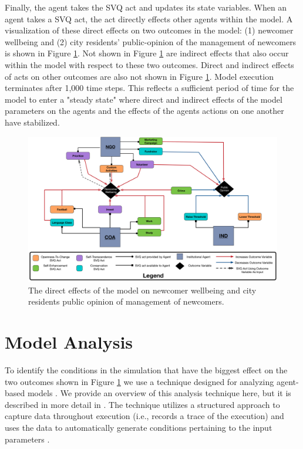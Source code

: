 \documentclass{scspaperproc}
\theoremstyle{scsthe}
\begin{document}
Finally, the agent takes the SVQ act and updates its state variables. When an agent takes a SVQ act, the act directly effects other agents within the model. A visualization of these direct effects on two outcomes in the model: (1) newcomer wellbeing and (2) city residents' public-opinion of the management of newcomers is shown in Figure \ref{fig:model-dynamics}. Not shown in Figure \ref{fig:model-dynamics} are indirect effects that also occur within the model with respect to these two outcomes. Direct and indirect effects of acts on other outcomes are also not shown in Figure \ref{fig:model-dynamics}. Model execution terminates after 1,000 time steps. This reflects a sufficient period of time for the model to enter a "steady state" where direct and indirect effects of the model parameters on the agents and the effects of the agents actions on one another have stabilized.

\begin{figure}[htb]
{
\centering
\includegraphics[width=0.95\columnwidth]{Newcomer-Wellbeing-Causal.png}
\caption{The direct effects of the model on newcomer wellbeing and city residents public opinion of management of newcomers.}
\label{fig:model-dynamics}
}
\end{figure}

\section{Model Analysis}
To identify the conditions in the simulation that have the biggest effect on the two outcomes shown in Figure \ref{fig:model-dynamics} we use a technique designed for analyzing agent-based models \cite{gore2017applying}. We provide an overview of this analysis technique here, but it is described in more detail in \cite{gore2015statistical}. The technique utilizes a structured approach to capture data throughout execution (i.e., records a trace of the execution) and uses the data to automatically generate conditions pertaining to the input parameters \cite{gore2017augmenting}. 
\end{document}
